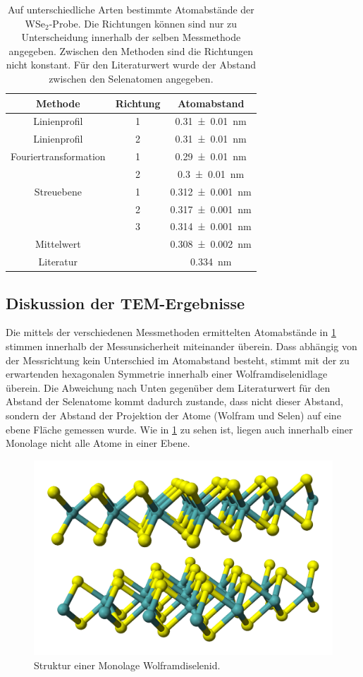 	\begin{table}
		\centering
		\caption{Auf unterschiedliche Arten bestimmte Atomabstände der WSe$_2$-Probe. Die Richtungen können sind nur zu Unterscheidung innerhalb der selben Messmethode angegeben. Zwischen den Methoden sind die Richtungen nicht konstant.
    Für den Literaturwert wurde der Abstand zwischen den Selenatomen angegeben.}
		\begin{tabular}{c| c | c}
			Methode & Richtung & Atomabstand \\ \hline
      Linienprofil &  1 & \SI{0.31 \pm 0.01}{nm}\\
      Linienprofil &  2 & \SI{0.31 \pm 0.01}{nm}\\
      Fouriertransformation & 1 & \SI{0.29 \pm 0.01}{nm}\\
      & 2 & \SI{0.3 \pm 0.01}{nm}\\
      Streuebene & 1 & \SI{0,312 \pm 0.001}{nm} \\
      & 2 & \SI{0,317 \pm 0.001}{nm} \\
      & 3 & \SI{0,314 \pm 0.001}{nm} \\
      Mittelwert & & \SI{0,308 \pm 0.002}{nm}\\
      Literatur & & \SI{0,334}{nm} \cite{wiki_wse}\\
		\end{tabular}
		\label{tab:netz}
	\end{table}

\subsection{Diskussion der TEM-Ergebnisse}

  Die mittels der verschiedenen Messmethoden ermittelten Atomabstände in \cref{tab:netz} stimmen innerhalb der Messunsicherheit miteinander überein.
  Dass abhängig von der Messrichtung kein Unterschied im Atomabstand besteht, stimmt mit der zu erwartenden hexagonalen Symmetrie innerhalb einer Wolframdiselenidlage überein.
  Die Abweichung nach Unten gegenüber dem Literaturwert für den Abstand der Selenatome kommt dadurch zustande, dass nicht dieser Abstand, sondern der Abstand der Projektion der Atome (Wolfram und Selen) auf eine ebene Fläche gemessen wurde.
  Wie in \cref{fig:strukt} zu sehen ist, liegen auch innerhalb einer Monolage nicht alle Atome in einer Ebene.

	\begin{figure}[H]
  \centering
			\includegraphics[width= 0.4 \linewidth]{img/strukt}
			\caption{
        Struktur einer Monolage Wolframdiselenid. \cite{wiki_wse_bild}
			}
			\label{fig:strukt}
	\end{figure}

